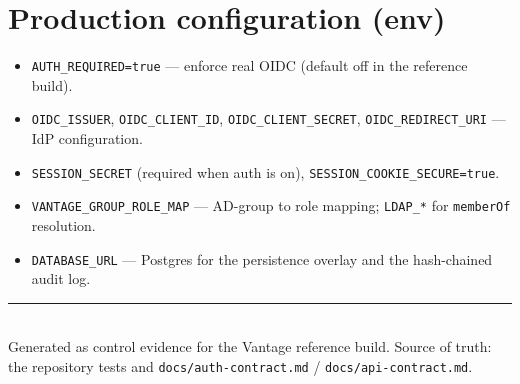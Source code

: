 \documentclass[11pt,a4paper]{article}
\newcommand{\code}[1]{\texttt{#1}}
\begin{document}
\section{Production configuration (env)}
\begin{itemize}
  \item \code{AUTH\_REQUIRED=true} --- enforce real OIDC (default off in the
        reference build).
  \item \code{OIDC\_ISSUER}, \code{OIDC\_CLIENT\_ID}, \code{OIDC\_CLIENT\_SECRET},
        \code{OIDC\_REDIRECT\_URI} --- IdP configuration.
  \item \code{SESSION\_SECRET} (required when auth is on), \code{SESSION\_COOKIE\_SECURE=true}.
  \item \code{VANTAGE\_GROUP\_ROLE\_MAP} --- AD-group to role mapping;
        \code{LDAP\_*} for \code{memberOf} resolution.
  \item \code{DATABASE\_URL} --- Postgres for the persistence overlay and the
        hash-chained audit log.
\end{itemize}

\vfill
\noindent\rule{\textwidth}{0.4pt}\\
\small Generated as control evidence for the Vantage reference build. Source of
truth: the repository tests and \code{docs/auth-contract.md} / \code{docs/api-contract.md}.
\end{document}
